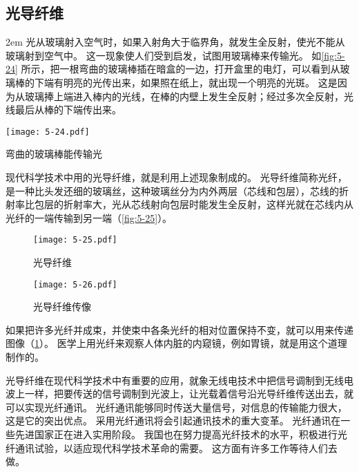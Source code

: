 \subsection{光导纤维}
\medskip\noindent
\begin{minipage}{0.55\linewidth}\parindent2em
光从玻璃射入空气时，如果入射角大于临界角，就发生全反射，使光不能从玻璃射到空气中。
这一现象使人们受到启发，试图用玻璃棒来传输光。
如\cref{fig:5-24} 所示，把一根弯曲的玻璃棒插在暗盒的一边，打开盒里的电灯，可以看到从玻璃棒的下端有明亮的光传出来，如果照在纸上，就出现一个明亮的光斑。
这是因为从玻璃捧上端进入棒内的光线，在棒的内壁上发生全反射；经过多次全反射，光线最后从棒的下端传出来。
\end{minipage}\hfill
\begin{minipage}{0.4\linewidth}\centering
  \begin{figurehere}
    \texttt{[image: 5-24.pdf]}
    \caption{弯曲的玻璃棒能传输光}\label{fig:5-24}
  \end{figurehere}
\end{minipage}

\medskip
现代科学技术中用的光导纤维，就是利用上述现象制成的。
光导纤维简称光纤，是一种比头发还细的玻璃丝，这种玻璃丝分为内外两层（芯线和包层），芯线的折射率比包层的折射率大，光从芯线射向包层时能发生全反射，这样光就在芯线内从光纤的一端传输到另一端（\cref{fig:5-25}）。
\begin{figure}
	\begin{minipage}[b]{0.48\linewidth}\centering
    \texttt{[image: 5-25.pdf]}
    \caption{光导纤维}\label{fig:5-25}
	\end{minipage}
	\begin{minipage}[b]{0.48\linewidth}\centering
    \texttt{[image: 5-26.pdf]}
    \caption{光导纤维传像}\label{fig:5-26}
	\end{minipage}
\end{figure}

如果把许多光纤并成束，并使束中各条光纤的相对位置保持不变，就可以用来传递图像（\cref{fig:5-26}）。
医学上用光纤来观察人体内脏的内窥镜，例如胃镜，就是用这个道理制作的。

光导纤维在现代科学技术中有重要的应用，就象无线电技术中把信号调制到无线电波上一样，把要传送的信号调制到光波上，让光载着信号沿光导纤维传送出去，就可以实现光纤通讯。
光纤通讯能够同时传送大量信号，对信息的传输能力很大，这是它的突出优点。
采用光纤通讯将会引起通讯技术的重大变革。
光纤通讯在一些先进国家正在进入实用阶段。
我国也在努力提高光纤技术的水平，积极进行光纤通讯试验，以适应现代科学技术革命的需要。
这方面有许多工作等待人们去做。

